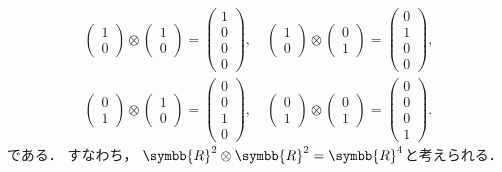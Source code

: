 \documentclass[../sotsu.tex]{subfiles}
\begin{document}
\begin{equation}
    \label{eq:basis-of-tensor-product-of-2-vector}
    \begin{split}
        \begin{pmatrix}
            1  \\  0
        \end{pmatrix}
        \otimes
        \begin{pmatrix}
            1  \\  0
        \end{pmatrix}
        =
        \begin{pmatrix}
            1  \\  0  \\  0  \\  0
        \end{pmatrix}
        ,
        \quad
        \begin{pmatrix}
            1  \\  0
        \end{pmatrix}
        \otimes
        \begin{pmatrix}
            0  \\  1
        \end{pmatrix}
        =
        \begin{pmatrix}
            0  \\  1  \\  0  \\  0
        \end{pmatrix}
        ,
        \\
        \begin{pmatrix}
            0  \\  1
        \end{pmatrix}
        \otimes
        \begin{pmatrix}
            1  \\  0
        \end{pmatrix}
        =
        \begin{pmatrix}
            0  \\  0  \\  1  \\  0
        \end{pmatrix}
        ,
        \quad
        \begin{pmatrix}
            0  \\  1
        \end{pmatrix}
        \otimes
        \begin{pmatrix}
            0  \\  1
        \end{pmatrix}
        =
        \begin{pmatrix}
            0  \\  0  \\  0  \\  1
        \end{pmatrix}
        .
    \end{split}
\end{equation}
である．
すなわち，
$\symbb{R}^2 \otimes \symbb{R}^2 = \symbb{R}^4$と考えられる．
\end{document}
